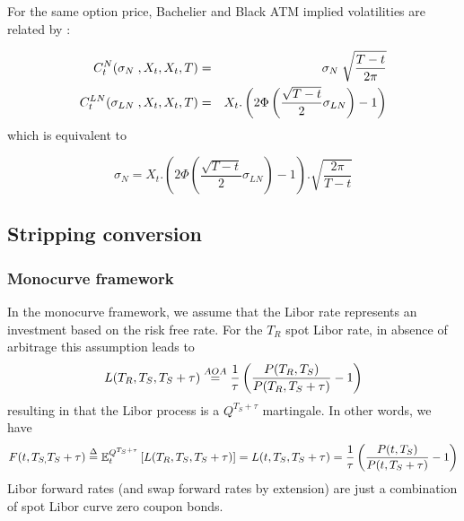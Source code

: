\documentclass[3pt]{article}
\begin{document}
\bigskip

\bigskip

\bigskip

For the same option price, Bachelier and Black ATM implied volatilities are
related by :

\begin{eqnarray*}
C_{t}^{N}(\sigma _{N\text{ }},X_{t},X_{t},T) &=&\sigma _{N\text{ }}\sqrt{%
\frac{T-t}{2\pi }} \\
C_{t}^{LN}(\sigma _{LN\text{ }},X_{t},X_{t},T) &=&X_{t}.\left( 2\Phi \left( 
\frac{\sqrt{T-t}}{2}\sigma _{LN}\right) -1\right)
\end{eqnarray*}%
which is equivalent to

\begin{equation*}
\sigma _{N}=X_{t}.\left( 2\Phi \left( \frac{\sqrt{T-t}}{2}\sigma
_{LN}\right) -1\right) .\sqrt{\frac{2\pi }{T-t}}
\end{equation*}

\bigskip

\bigskip

\subsection{Stripping conversion}

\bigskip

\subsubsection{Monocurve framework}

\bigskip In the monocurve framework, we assume that the Libor rate
represents an investment based on the risk free rate. For the $T_{R}$ spot
Libor rate, in absence of arbitrage this assumption leads to%
\begin{equation*}
L(T_{R},T_{S},T_{S}+\tau )\overset{AOA}{=}\frac{1}{\tau }\left( \frac{%
P(T_{R},T_{S})}{P(T_{R},T_{S}+\tau )}-1\right)
\end{equation*}%
resulting in that the Libor process is a $Q^{T_{S}+\tau }$ martingale. In
other words, we have 
\begin{equation*}
F(t,T_{S,}T_{S}+\tau )\overset{\Delta }{=}\mathbb{E}_{t}^{Q^{T_{S}+\tau }}%
\left[ L(T_{R},T_{S},T_{S}+\tau )\right] =L(t,T_{S},T_{S}+\tau )=\frac{1}{%
\tau }\left( \frac{P(t,T_{S})}{P(t,T_{S}+\tau )}-1\right)
\end{equation*}%
Libor forward rates (and swap forward rates by extension) are just a
combination of spot Libor curve zero coupon bonds.
\end{document}
